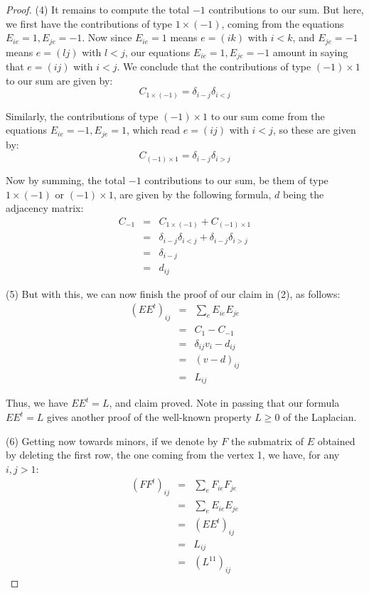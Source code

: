 \documentclass[12pt]{amsbook}
\begin{document}
\begin{proof}
(4) It remains to compute the total $-1$ contributions to our sum. But here, we first have the contributions of type $1\times(-1)$, coming from the equations $E_{ie}=1,E_{je}=-1$. Now since $E_{ie}=1$ means $e=(ik)$ with $i<k$, and $E_{je}=-1$ means $e=(lj)$ with $l<j$, our equations $E_{ie}=1,E_{je}=-1$ amount in saying that $e=(ij)$ with $i<j$. We conclude that the contributions of type $(-1)\times1$ to our sum are given by:
$$C_{1\times(-1)}=\delta_{i-j}\delta_{i<j}$$

Similarly, the contributions of type $(-1)\times1$ to our sum come from the equations $E_{ie}=-1,E_{je}=1$, which read $e=(ij)$ with $i<j$, so these are given by:
$$C_{(-1)\times1}=\delta_{i-j}\delta_{i>j}$$

Now by summing, the total $-1$ contributions to our sum, be them of type $1\times(-1)$ or $(-1)\times1$, are given by the following formula, $d$ being the adjacency matrix:
\begin{eqnarray*}
C_{-1}
&=&C_{1\times(-1)}+C_{(-1)\times1}\\
&=&\delta_{i-j}\delta_{i<j}+\delta_{i-j}\delta_{i>j}\\
&=&\delta_{i-j}\\
&=&d_{ij}
\end{eqnarray*}

(5) But with this, we can now finish the proof of our claim in (2), as follows:
\begin{eqnarray*}
(EE^t)_{ij}
&=&\sum_eE_{ie}E_{je}\\
&=&C_1-C_{-1}\\
&=&\delta_{ij}v_i-d_{ij}\\
&=&(v-d)_{ij}\\
&=&L_{ij}
\end{eqnarray*}

Thus, we have $EE^t=L$, and claim proved. Note in passing that our formula $EE^t=L$ gives another proof of the well-known property $L\geq0$ of the Laplacian.

\medskip

(6) Getting now towards minors, if we denote by $F$ the submatrix of $E$ obtained by deleting the first row, the one coming from the vertex 1, we have, for any $i,j>1$:
\begin{eqnarray*}
(FF^t)_{ij}
&=&\sum_eF_{ie}F_{je}\\
&=&\sum_eE_{ie}E_{je}\\
&=&(EE^t)_{ij}\\
&=&L_{ij}\\
&=&(L^{11})_{ij}
\end{eqnarray*}


\end{proof}
\end{document}
